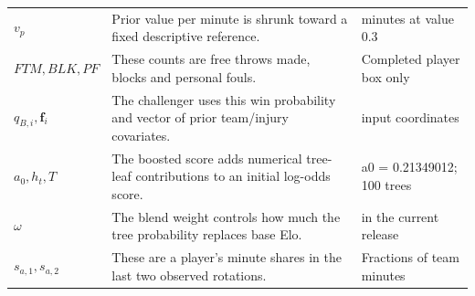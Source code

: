 \documentclass[11pt]{article}
\begin{document}
\begin{longtable}{@{}>{\raggedright\arraybackslash}p{}>{\raggedright\arraybackslash}p{}>{\raggedright\arraybackslash}p{}@{}}
$v_p$ & Prior value per minute is shrunk toward a fixed descriptive reference. & 80 minutes at value 0.3\\
$FTM,BLK,PF$ & These counts are free throws made, blocks and personal fouls. & Completed player box only\\
$q_{B,i},\mathbf f_i$ & The challenger uses this win probability and vector of prior team/injury covariates. & 50 input coordinates\\
$a_0,h_t,T$ & The boosted score adds numerical tree-leaf contributions to an initial log-odds score. & a0 = 0.21349012; 100 trees\\
$\omega$ & The blend weight controls how much the tree probability replaces base Elo. & 1 in the current release\\
$s_{a,1},s_{a,2}$ & These are a player's minute shares in the last two observed rotations. & Fractions of team minutes\\
\end{longtable}

\endgroup
\end{document}
